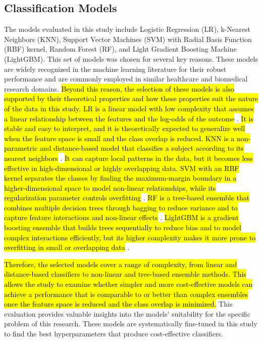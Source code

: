 \subsection{Classification Models}
The models evaluated in this study include Logistic Regression (\acrshort{LR}), k-Nearest Neighbors (\acrshort{KNN}), Support Vector Machines (\acrshort{SVM}) with Radial Basis Function (\acrshort{RBF}) kernel, Random Forest (\acrshort{RF}), and Light Gradient Boosting Machine (\acrshort{LightGBM}). This set of models was chosen for several key reasons. These models are widely recognized in the machine learning literature for their robust performance and are commonly employed in similar healthcare and biomedical research domains. \hl{Beyond this reason, the selection of these models is also supported by their theoretical properties and how these properties suit the nature of the data in this study. LR is a linear model with low complexity that assumes a linear relationship between the features and the log-odds of the outcome} \cite{Hastie2009Elements}. \hl{It is stable and easy to interpret, and it is theoretically expected to generalize well when the feature space is small and the class overlap is reduced. KNN is a non-parametric and distance-based model that classifies a subject according to its nearest neighbors} \cite{Cover1967Nearest}. \hl{It can capture local patterns in the data, but it becomes less effective in high-dimensional or highly overlapping data. SVM with an RBF kernel separates the classes by finding the maximum-margin boundary in a higher-dimensional space to model non-linear relationships, while its regularization parameter controls overfitting} \cite{Cortes1995Support}. \hl{RF is a tree-based ensemble that combines multiple decision trees through bagging to reduce variance and to capture feature interactions and non-linear effects} \cite{Breiman2001Random}. \hl{LightGBM is a gradient boosting ensemble that builds trees sequentially to reduce bias and to model complex interactions efficiently, but its higher complexity makes it more prone to overfitting in small or overlapping data} \cite{Ke2017LightGBM}.

\hl{Therefore, the selected models cover a range of complexity, from linear and distance-based classifiers to non-linear and tree-based ensemble methods. This allows the study to examine whether simpler and more cost-effective models can achieve a performance that is comparable to or better than complex ensembles once the feature space is reduced and the class overlap is minimized.} This evaluation provides valuable insights into the models' suitability for the specific problem of this research. These models are systematically fine-tuned in this study to find the best hyperparameters that produce cost-effective classifiers.

